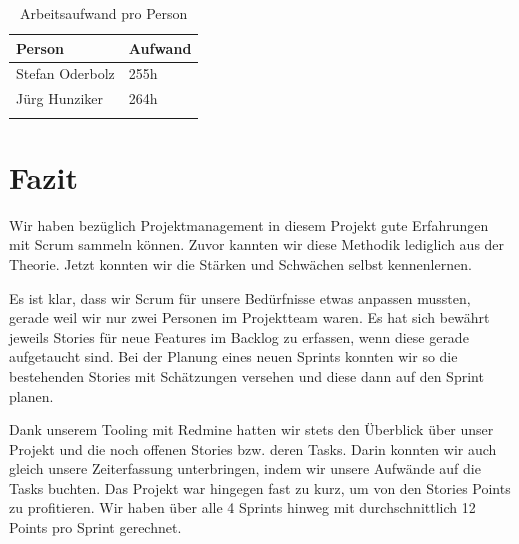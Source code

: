 \begin{longtable}{|l|l|}
\hline 
\textbf{Person} & \textbf{Aufwand} \\ 
\hline 
Stefan Oderbolz & 255h \\ 
\hline 
Jürg Hunziker & 264h \\ 
\hline 
\caption{Arbeitsaufwand pro Person}
\label{projektmanagement-arbeitsaufwand}
\end{longtable} 

\section{Fazit}
Wir haben bezüglich Projektmanagement in diesem Projekt gute Erfahrungen mit Scrum sammeln können. Zuvor kannten wir diese Methodik lediglich aus der Theorie. Jetzt konnten wir die Stärken und Schwächen selbst kennenlernen.

Es ist klar, dass wir Scrum für unsere Bedürfnisse etwas anpassen mussten, gerade weil wir nur zwei Personen im Projektteam waren. Es hat sich bewährt jeweils Stories für neue Features im Backlog zu erfassen, wenn diese gerade aufgetaucht sind. Bei der Planung eines neuen Sprints konnten wir so die bestehenden Stories mit Schätzungen versehen und diese dann auf den Sprint planen.

Dank unserem Tooling mit Redmine hatten wir stets den Überblick über unser Projekt und die noch offenen Stories bzw. deren Tasks. Darin konnten wir auch gleich unsere Zeiterfassung unterbringen, indem wir unsere Aufwände auf die Tasks buchten. Das Projekt war hingegen fast zu kurz, um von den Stories Points zu profitieren. Wir haben über alle 4 Sprints hinweg mit durchschnittlich 12 Points pro Sprint gerechnet.
